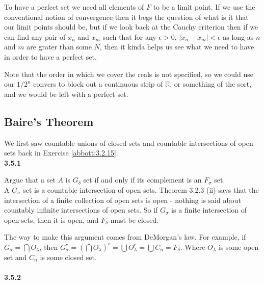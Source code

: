 To have a perfect set we need all elements of $F$ to be a limit point.
If we use the conventional notion of convergence then it begs the question of what is it that our limit points should be,
but if we look back at the Cauchy criterion then if we can find any pair of
$x_n$ and $x_m$ such that for any $\epsilon > 0$, $|x_n - x_m| < \epsilon$ as long as
$n$ and $m$ are grater than some $N$, then it kinda helps us see what we need to have in order to have
a perfect set.

Note that the order in which we cover the reals is not specified, so we could use our $1/2^n$ convers
to block out a continuous strip of $\mathbb{R}$, or something of the sort, and we would be left with a perfect set.




\subsection{Baire's Theorem}
\label{abbott:baires-theorem}

We first saw countable unions of closed sets and countable intersections of open sets back in
Exercise \ref{abbott:3.2.15}.
\\

\textbf{3.5.1}

Argue that a set $A$ is $G_\delta$ set if and only if its complement is an $F_\sigma$ set.
\\

A $G_\sigma$ set is a countable intersection of open sets.
Theorem 3.2.3 (ii) says that the intersection of a finite collection of open sets is open
- nothing is said about countably infinite intersections of open sets.
So if $G_\sigma$ is a finite intersection of open sets, then it is open, and $F_\delta$ must be closed.

The way to make this argument comes from DeMorgan's law.
For example, if $G_\sigma = \bigcap O_\lambda$, then
$G_{\sigma}^{c} = \left( \bigcap O_\lambda \right)^c = \bigcup O_{\lambda}^{c} = \bigcup C_n = F_\delta$.
Where $O_\lambda$ is some open set and $C_n$ is some closed set.
\\~\\


\textbf{3.5.2}

